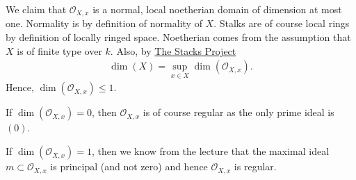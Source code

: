 \newcommand{\sheet}{11}




\maketitle{}

\begin{exercise}{1}
    We claim that $\mathcal{O}_{X,x}$ is a normal, local noetherian domain of dimension at most one. 
    Normality is by definition of normality of $X$. Stalks are of course local rings by definition of locally ringed space.
    Noetherian comes from the assumption that $X$ is of finite type over $k$. Also, by 
    \href{https://stacks.math.columbia.edu/tag/04MS}{The Stacks Project} 
    \begin{align*}
        \dim(X)=\sup_{x\in X}\dim(\mathcal{O}_{X,x}).
    \end{align*}
    Hence, $\dim(\mathcal{O}_{X,x})\le 1$.

    If $\dim(\mathcal{O}_{X,x})= 0$, then $\mathcal{O}_{X,x}$ is of course regular as the only prime ideal is $(0)$.

    If $\dim(\mathcal{O}_{X,x})= 1$, then we know from the lecture that the maximal ideal $m \subset \mathcal{O}_{X,x}$
    is principal (and not zero) and hence $\mathcal{O}_{X,x}$ is regular.
\end{exercise}


